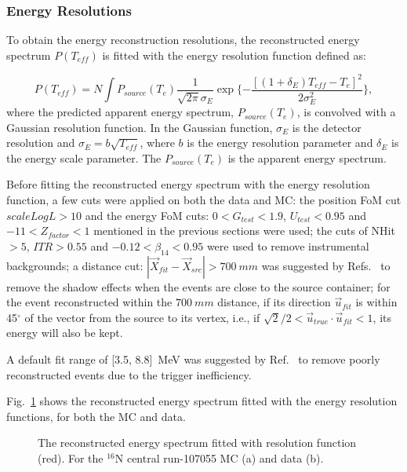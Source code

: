 \subsubsection{Energy Resolutions}

To obtain the energy reconstruction resolutions, the reconstructed energy spectrum $P(T_{eff})$ is fitted with the energy resolution function defined as\cite{waterunidoc}:

\begin{equation}
P(T_{eff})=N\int P_{source}(T_e)\frac{1}{\sqrt{2\pi}\sigma_E}\exp \{-\frac{[(1+\delta_E)T_{eff}-T_e]^2}{2\sigma_E^2}\},
\end{equation}
where the predicted apparent energy spectrum, $P_{source}(T_e)$, is convolved with a Gaussian resolution function. In the Gaussian function, $\sigma_E$ is the detector resolution and $\sigma_E = b\sqrt {T_{eff}}$, where $b$ is the energy resolution parameter and $\delta_E$ is the energy scale parameter. The $P_{source}(T_e)$ is the apparent energy spectrum.

Before fitting the reconstructed energy spectrum with the energy resolution function, a few cuts were applied on both the data and MC: the position FoM cut $scaleLogL>10$ and the energy FoM cuts: $0<G_{test}<1.9$, $U_{test}<0.95$ and $-11<Z_{factor}<1$ mentioned in the previous sections were used; the cuts of NHit$>5$, $ITR>0.55$ and $-0.12<\beta_{14}<0.95$ were used to remove instrumental backgrounds; a distance cut: $|\vec{X}_{fit}-\vec{X}_{src}|>700~mm$ was suggested by Refs.~\cite{leta,waterunidoc} to remove the shadow effects when the events are close to the source container; for the event reconstructed within the $700~mm$ distance, if its direction $\vec{u}_{fit}$ is within 45$^\circ$ of the vector from the source to its vertex, i.e., if $\sqrt2/2<\vec{u}_{true}\cdot \vec{u}_{fit}<1$, its energy will also be kept.

A default fit range of [3.5, 8.8]~MeV was suggested by Ref.~\cite{waterunidoc} to remove poorly reconstructed events due to the trigger inefficiency.

Fig.~\ref{fittedEnergyResol} shows the reconstructed energy spectrum fitted with the energy resolution functions, for both the MC and data.
\begin{figure}
	\centering
	\caption[The reconstructed energy spectrum fitted with resolution function.]{The reconstructed energy spectrum fitted with resolution function (red). For the $^{16}$N central run-107055 MC (a) and data (b).}
	\label{fittedEnergyResol}
\end{figure}


